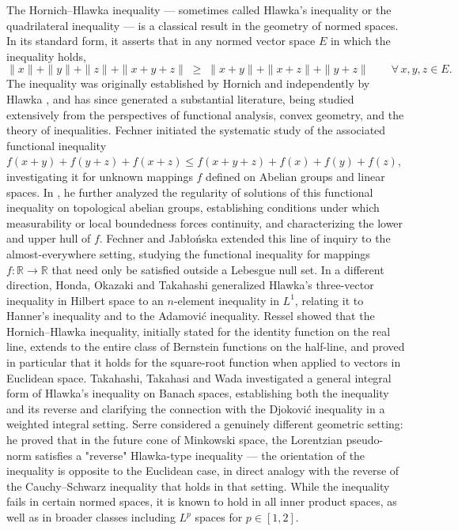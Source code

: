 \documentclass[a4paper,10pt]{article}
\theoremstyle{plain}
\theoremstyle{definition}
\theoremstyle{remark}
\begin{document}
The Hornich–Hlawka inequality — sometimes called Hlawka's inequality or the quadrilateral inequality — is a classical result in the geometry of normed spaces. In its standard form, it asserts that in any normed vector space $E$ in which the inequality holds,
\[\|x\| + \|y\| + \|z\| + \|x+y+z\| \;\geq\; \|x+y\| + \|x+z\| + \|y+z\| \qquad \forall\, x,y,z \in E.\]
The inequality was originally established by Hornich \cite{Hornich1942} and independently by Hlawka \cite{Hlawka1990}, and has since generated a substantial literature, being studied extensively from the perspectives of functional analysis, convex geometry, and the theory of inequalities. Fechner \cite{Fechner2014} initiated the systematic study of the associated functional inequality $f(x+y)+f(y+z)+f(x+z) \leq f(x+y+z)+f(x)+f(y)+f(z)$, investigating it for unknown mappings $f$ defined on Abelian groups and linear spaces. In \cite{Fechner2017}, he further analyzed the regularity of solutions of this functional inequality on topological abelian groups, establishing conditions under which measurability or local boundedness forces continuity, and characterizing the lower and upper hull of $f$. Fechner and Jabłońska \cite{FechnerJablonska2025} extended this line of inquiry to the almost-everywhere setting, studying the functional inequality for mappings $f:\mathbb{R}\to\mathbb{R}$ that need only be satisfied outside a Lebesgue null set. In a different direction, Honda, Okazaki and Takahashi \cite{HondaOkazakiTakahashi1998} generalized Hlawka's three-vector inequality in Hilbert space to an $n$-element inequality in $L^1$, relating it to Hanner's inequality and to the Adamović inequality. Ressel \cite{Ressel2015} showed that the Hornich–Hlawka inequality, initially stated for the identity function on the real line, extends to the entire class of Bernstein functions on the half-line, and proved in particular that it holds for the square-root function when applied to vectors in Euclidean space. Takahashi, Takahasi and Wada \cite{TakahashiTakahasiWada2009} investigated a general integral form of Hlawka's inequality on Banach spaces, establishing both the inequality and its reverse and clarifying the connection with the Djoković inequality in a weighted integral setting. Serre \cite{Serre2015} considered a genuinely different geometric setting: he proved that in the future cone of Minkowski space, the Lorentzian pseudo-norm satisfies a "reverse" Hlawka-type inequality — the orientation of the inequality is opposite to the Euclidean case, in direct analogy with the reverse of the Cauchy–Schwarz inequality that holds in that setting. While the inequality fails in certain normed spaces, it is known to hold in all inner product spaces, as well as in broader classes including $L^p$ spaces for $p \in [1,2]$. \\ \\
\end{document}
